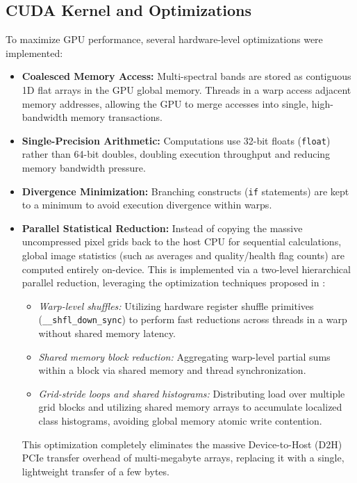 \documentclass[10pt,conference,compsoc]{IEEEtran}
\begin{document}
\subsection{CUDA Kernel and Optimizations}
To maximize GPU performance, several hardware-level optimizations were implemented:
\begin{itemize}
    \item \textbf{Coalesced Memory Access:} Multi-spectral bands are stored as contiguous 1D flat arrays in the GPU global memory. Threads in a warp access adjacent memory addresses, allowing the GPU to merge accesses into single, high-bandwidth memory transactions.
    \item \textbf{Single-Precision Arithmetic:} Computations use 32-bit floats (\texttt{float}) rather than 64-bit doubles, doubling execution throughput and reducing memory bandwidth pressure.
    \item \textbf{Divergence Minimization:} Branching constructs (\texttt{if} statements) are kept to a minimum to avoid execution divergence within warps.
    \item \textbf{Parallel Statistical Reduction:} Instead of copying the massive uncompressed pixel grids back to the host CPU for sequential calculations, global image statistics (such as averages and quality/health flag counts) are computed entirely on-device. This is implemented via a two-level hierarchical parallel reduction,  leveraging the optimization techniques proposed in \cite{harris2007optimizing}:
    \begin{itemize}
        \item \emph{Warp-level shuffles:} Utilizing hardware register shuffle primitives (\texttt{\_\_shfl\_down\_sync}) to perform fast reductions across threads in a warp without shared memory latency.
        \item \emph{Shared memory block reduction:} Aggregating warp-level partial sums within a block via shared memory and thread synchronization.
        \item \emph{Grid-stride loops and shared histograms:} Distributing load over multiple grid blocks and utilizing shared memory arrays to accumulate localized class histograms, avoiding global memory atomic write contention.
    \end{itemize}
    This optimization completely eliminates the massive Device-to-Host (D2H) PCIe transfer overhead of multi-megabyte arrays, replacing it with a single, lightweight transfer of a few bytes.
\end{itemize}
\end{document}
